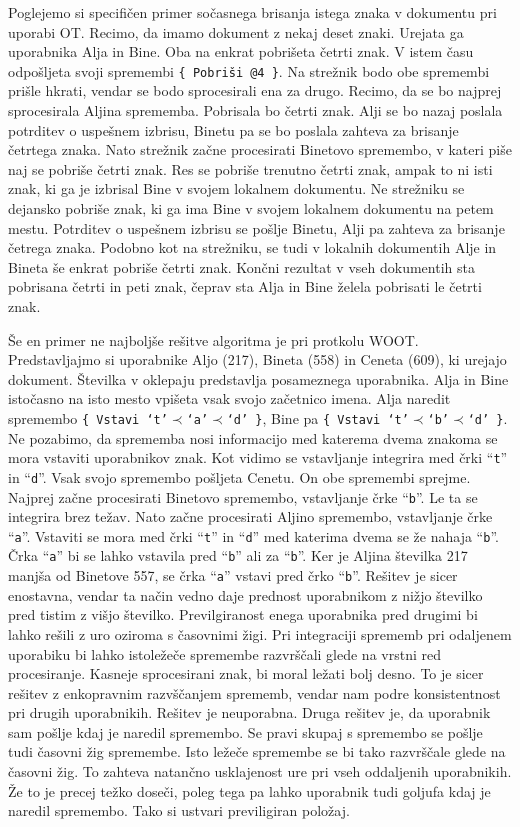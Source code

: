 \documentclass[a4paper, 12pt, twoside]{book}
\begin{document}
Poglejemo si specifičen primer sočasnega brisanja istega znaka v dokumentu pri uporabi OT. Recimo, da imamo dokument z nekaj deset znaki. Urejata ga uporabnika Alja in Bine. Oba na enkrat pobrišeta četrti znak. V istem času odpošljeta svoji spremembi {\tt \{ Pobriši @4 \}}. Na strežnik bodo obe spremembi prišle hkrati, vendar se bodo sprocesirali ena za drugo. Recimo, da se bo najprej sprocesirala Aljina sprememba. Pobrisala bo četrti znak. Alji se bo nazaj poslala potrditev o uspešnem izbrisu, Binetu pa se bo poslala zahteva za brisanje četrtega znaka. Nato strežnik začne procesirati Binetovo spremembo, v kateri piše naj se pobriše četrti znak. Res se pobriše trenutno četrti znak, ampak to ni isti znak, ki ga je izbrisal Bine v svojem lokalnem dokumentu. Ne strežniku se dejansko pobriše znak, ki ga ima Bine v svojem lokalnem dokumentu na petem mestu. Potrditev o uspešnem izbrisu se pošlje Binetu, Alji pa zahteva za brisanje četrega znaka. Podobno kot na strežniku, se tudi v lokalnih dokumentih Alje in Bineta še enkrat pobriše četrti znak. Končni rezultat v vseh dokumentih sta pobrisana četrti in peti znak, čeprav sta Alja in Bine želela pobrisati le četrti znak.

Še en primer ne najboljše rešitve algoritma je pri protkolu WOOT. Predstavljajmo si uporabnike Aljo (217), Bineta (558) in Ceneta (609), ki urejajo dokument. Številka v oklepaju predstavlja posameznega uporabnika. Alja in Bine istočasno na isto mesto vpišeta vsak svojo začetnico imena. Alja naredit spremembo {\tt \{ Vstavi ‘t’$\prec$‘a’$\prec$‘d’ \}}, Bine pa {\tt \{ Vstavi ‘t’$\prec$‘b’$\prec$‘d’ \}}. Ne pozabimo, da sprememba nosi informacijo med katerema dvema znakoma se mora vstaviti uporabnikov znak. Kot vidimo se vstavljanje integrira med črki “{\tt t}” in “{\tt d}”.  Vsak svojo spremembo pošljeta Cenetu. On obe spremembi sprejme. Najprej začne procesirati Binetovo spremembo, vstavljanje črke “{\tt b}”. Le ta se integrira brez težav. Nato začne procesirati Aljino spremembo, vstavljanje črke “{\tt a}”. Vstaviti se mora med črki “{\tt t}” in “{\tt d}” med katerima dvema se že nahaja “{\tt b}”. Črka “{\tt a}” bi se lahko vstavila pred “{\tt b}” ali za “{\tt b}”. Ker je Aljina številka 217 manjša od Binetove 557, se črka “{\tt a}” vstavi pred črko “{\tt b}”. Rešitev je sicer enostavna, vendar ta način vedno daje prednost uporabnikom z nižjo številko pred tistim z višjo številko. Previlgiranost enega uporabnika pred drugimi bi lahko rešili z uro oziroma s časovnimi žigi. Pri integraciji sprememb pri odaljenem uporabiku bi lahko istoležeče spremembe razvrščali glede na vrstni red procesiranje. Kasneje sprocesirani znak, bi moral ležati bolj desno. To je sicer rešitev z enkopravnim razvščanjem sprememb, vendar nam podre konsistentnost pri drugih uporabnikih. Rešitev je neuporabna. Druga rešitev je, da uporabnik sam pošlje kdaj je naredil spremembo. Se pravi skupaj s spremembo se pošlje tudi časovni žig spremembe. Isto ležeče spremembe se bi tako razvrščale glede na časovni žig. To zahteva natančno usklajenost ure pri vseh oddaljenih uporabnikih. Že to je precej težko doseči, poleg tega pa lahko uporabnik tudi goljufa kdaj je naredil spremembo. Tako si ustvari previligiran položaj.
\end{document}

